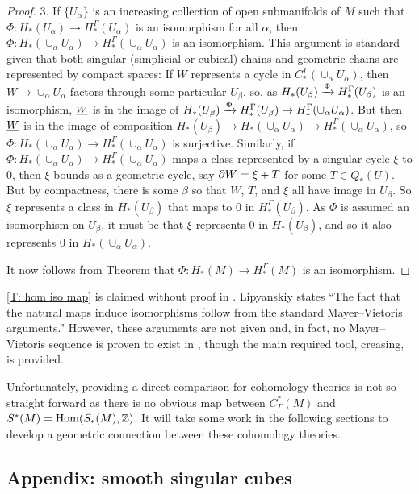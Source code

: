 \begin{proof}
	3.
	If $\{U_\alpha\}$ is an increasing collection of open submanifolds of $M$ such that $\Phi \colon H_*(U_\alpha) \to H_*^\Gamma(U_\alpha)$ is an isomorphism for all $\alpha$, then $\Phi \colon H_*(\cup_\alpha U_\alpha) \to H_*^\Gamma(\cup_\alpha U_\alpha)$ is an isomorphism.
	This argument is standard given that both singular (simplicial or cubical) chains and geometric chains are represented by compact spaces: If $W$ represents a cycle in $C_*^\Gamma(\cup_\alpha U_\alpha)$, then $W \to \cup_\alpha U_\alpha$ factors through some particular $U_\beta$, so, as $H_*(U_\beta) \xrightarrow{\Phi}H_*^\Gamma(U_\beta)$ is an isomorphism, $\underline{W}$ is in the image of $H_*(U_\beta) \xrightarrow{\Phi}H_*^\Gamma(U_\beta) \to H_*^\Gamma(\cup_\alpha U_\alpha)$.
	But then $\underline{W}$ is in the image of composition $H_*(U_\beta) \to H_*(\cup_\alpha U_\alpha) \to H_*^\Gamma(\cup_\alpha U_\alpha)$, so $\Phi \colon H_*(\cup_\alpha U_\alpha) \to H_*^\Gamma(\cup_\alpha U_\alpha)$ is surjective.
	Similarly, if $\Phi \colon H_*(\cup_\alpha U_\alpha) \to H_*^\Gamma(\cup_\alpha U_\alpha)$ maps a class represented by a singular cycle $\xi$ to $0$, then $\xi$ bounds as a geometric cycle, say $\partial W = \xi+T$ for some $T \in Q_*(U)$.
	But by compactness, there is some $\beta$ so that $W$, $T$, and $\xi$ all have image in $U_\beta$.
	So $\xi$ represents a class in $H_*(U_\beta)$ that maps to $0$ in $H_*^\Gamma(U_\beta)$.
	As $\Phi$ is assumed an isomorphism on $U_\beta$, it must be that $\xi$ represents $0$ in $H_*(U_\beta)$, and so it also represents $0$ in $H_*(\cup_\alpha U_\alpha)$.

	It now follows from Theorem \cite[5.1.1]{Frie20} that $\Phi: H_*(M) \to H_*^\Gamma(M)$ is an isomorphism.
\end{proof}

\cref{T: hom iso map} is claimed without proof in \cite[Section 10]{Lipy14}.
Lipyanskiy states ``The fact that the natural maps induce isomorphisms follow from the standard Mayer--Vietoris arguments.'' However, these arguments are not given and, in fact, no Mayer--Vietoris sequence is proven to exist in \cite{Lipy14}, though the main required tool, creasing, is provided.

Unfortunately, providing a direct comparison for cohomology theories is not so straight forward as there is no obvious map between $C^*_\Gamma(M)$ and $S^*(M) = \textup{Hom}(S_*(M),\mathbb{Z})$.
It will take some work in the following sections to develop a geometric connection between these cohomology theories.

\subsection{Appendix: smooth singular cubes}


